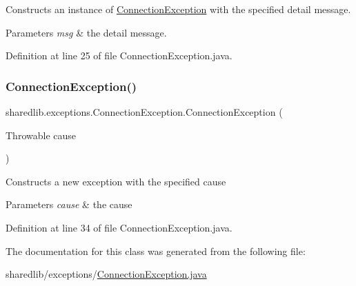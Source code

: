 Constructs an instance of {\ttfamily \hyperlink{classsharedlib_1_1exceptions_1_1_connection_exception}{Connection\+Exception}} with the specified detail message.


\begin{DoxyParams}{Parameters}
{\em msg} & the detail message. \\
\hline
\end{DoxyParams}


Definition at line 25 of file Connection\+Exception.\+java.

\hypertarget{classsharedlib_1_1exceptions_1_1_connection_exception_a6148dbd8940197621d740066e0506b8b}{}\label{classsharedlib_1_1exceptions_1_1_connection_exception_a6148dbd8940197621d740066e0506b8b} 
\subsubsection{\texorpdfstring{Connection\+Exception()}{ConnectionException()}\hspace{0.1cm}{\footnotesize\ttfamily [3/3]}}
{\footnotesize\ttfamily sharedlib.\+exceptions.\+Connection\+Exception.\+Connection\+Exception (\begin{DoxyParamCaption}\item[{Throwable}]{cause }\end{DoxyParamCaption})}

Constructs a new exception with the specified cause


\begin{DoxyParams}{Parameters}
{\em cause} & the cause \\
\hline
\end{DoxyParams}


Definition at line 34 of file Connection\+Exception.\+java.



The documentation for this class was generated from the following file\+:\begin{DoxyCompactItemize}
\item 
sharedlib/exceptions/\hyperlink{_connection_exception_8java}{Connection\+Exception.\+java}\end{DoxyCompactItemize}
